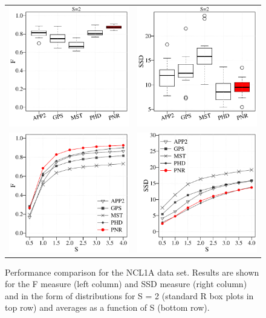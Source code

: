\begin{figure}
	\centering
	\begin{tabular}{cc}
		\includegraphics[width=0.35\columnwidth]{fig15a} &
		\includegraphics[width=0.35\columnwidth]{fig15b} \\%
		\includegraphics[width=0.35\columnwidth]{fig15c} &
		\includegraphics[width=0.35\columnwidth]{fig15d}
	\end{tabular}
	\caption{Performance comparison for the NCL1A data set. Results are shown for the F measure (left column) and SSD measure (right column) and in the form of distributions for S = 2 (standard R box plots in top row) and averages as a function of S (bottom row).}
	\label{ch4_fig15}
\end{figure}

